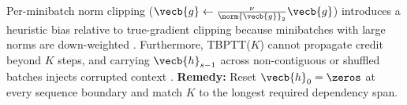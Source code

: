 \documentclass[../../../../master.tex]{subfiles}
\begin{document}
\begin{pitfall}
Per-minibatch norm clipping ($\vecb{g} \leftarrow \frac{\nu}{\norm{\vecb{g}}_2}\vecb{g}$) introduces a heuristic bias relative to true-gradient clipping because minibatches with large norms are down-weighted . Furthermore, TBPTT($K$) cannot propagate credit beyond $K$ steps, and carrying $\vecb{h}_{s-1}$ across non-contiguous or shuffled batches injects corrupted context . \textbf{Remedy:} Reset $\vecb{h}_0 = \zeros$ at every sequence boundary and match $K$ to the longest required dependency span.
\end{pitfall}
\end{document}
